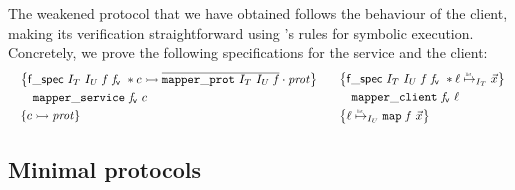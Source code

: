The weakened protocol that we have obtained follows the behaviour of the client,
making its verification straightforward using \lname's rules for symbolic execution.
Concretely, we prove the following specifications for the service and the client:
\newcommand{\mapname}{\defemph{map}}
\[
\begin{array}{c !{\ } c}
\begin{array}{l}
  \hoareV
    {
  \begin{array}{@{} l @{}}
    \mapspecname\
     \interpvar_\tvar\
     \interpvar_\tvarB\
     \mapvar\ \vmapvar\ *
  \interp \chan
  {\protapp{\dual{\mapperprotname\ \interpvar_\tvar\ \interpvar_\tvarB\ \mapvar}}
    {\prot}}
    \end{array}}
  { \mapperservicename\ \vmapvar\ \chan}
    {\interp \chan {\prot}}
\end{array}
  &
\begin{array}{@{} l @{}}
  \hoareV
    {
     \mapspecname\
     \interpvar_\tvar\
     \interpvar_\tvarB\
     \mapvar\ \vmapvar\ *
  \listrefI {\interpvar_\tvar} \loc {\vec\var}}
  { \mapperclientname\ \vmapvar\ \loc}
    { \listrefI {\interpvar_\tvarB} \loc {\mapname\ \mapvar\ \vec\var}}
\end{array}
\end{array}
\]

\subsection{Minimal protocols}
\label{sec:subprotocol_reuse}

\newcommand{\tvarF}{R}
\newcommand{\listrevname}{\mathtt{list\_rev}}
\newcommand{\listrevservicename}{\listrevname\_{\mathtt{service}}}
\newcommand{\listrevclientname}{\listrevname\_{\mathtt{client}}}
\newcommand{\listrevprotname}{\logdefemph{list\_rev\_prot}}

\newcommand{\listrevfig}{
\begin{figure}[t!]
\begin{equation*}
\begin{array}[t]{@{} l @{}}
  \listrevservicename\ \chan \eqdef\\
  \quad
  \Let \loc = \recv{\chan} in \listrevname\ \loc;\ \send{\TT}
\end{array}
\qquad
\begin{array}[t]{@{} l @{}}
  \listrevclientname\ \loc\ \eqdef\\
  \quad
  \begin{array}[t]{@{} l @{}}
    \Let {\chan} = {\start {\listrevservicename}} in\\
    \send \chan \loc;\ \recv{\chan}
  \end{array}
\end{array}
\end{equation*}
\caption{A list reversing service
(the code for the function $\listrevname$ has been elided).}
\label{fig:listrevprog}
\end{figure}
}

